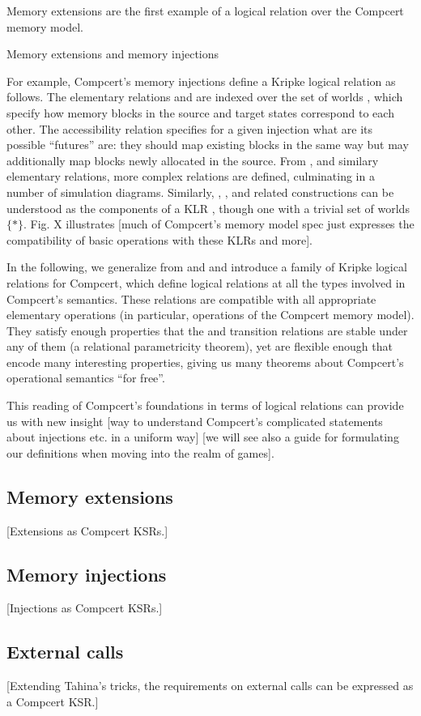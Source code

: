 Memory extensions are the first example of
a logical relation over the Compcert memory model.


Memory extensions and memory injections 

For example,
Compcert's memory injections
define a Kripke logical relation  as follows.
The elementary relations  and 
are indexed over the set of worlds ,
which specify how memory blocks in the source and target states
correspond to each other.
The accessibility relation 
specifies for a given injection
what are its possible ``futures'' are:
they should map existing blocks in the same way
but may additionally map blocks newly allocated in the source.
From ,  and similary elementary relations,
more complex relations are defined,
culminating in a number of simulation diagrams.
Similarly,
, , and related constructions
can be understood as the components of a KLR ,
though one with a trivial set of worlds $\{*\}$.
Fig. X illustrates [much of Compcert's memory model spec
just expresses the compatibility of basic operations
with these KLRs and more].

In the following,
we generalize from  and  and
introduce a family of Kripke logical relations for Compcert,
which define logical relations at all the types
involved in Compcert's semantics.
These relations are compatible with
all appropriate elementary operations
(in particular, operations of the Compcert memory model).
They satisfy enough properties that
the  and  transition relations
are stable under any of them
(a relational parametricity theorem),
yet are flexible enough that encode many interesting properties,
giving us many theorems about Compcert's operational semantics
``for free''.

This reading of Compcert's foundations
in terms of logical relations
can provide us with new insight
[way to understand Compcert's complicated
statements about injections etc. in a uniform way]
[we will see also a guide for formulating our definitions
when moving into the realm of games].



\subsection{Memory extensions} %

[Extensions as Compcert KSRs.]


\subsection{Memory injections} %

[Injections as Compcert KSRs.]


\subsection{External calls} %

[Extending Tahina's tricks,
the requirements on
external calls
can be expressed as a Compcert KSR.]

